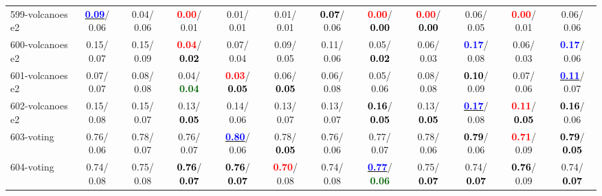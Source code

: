 \begin{table}[h]
\begin{center}
{\begin{tabular}{lc|c|c|c|c|c|c|c|c|c|c}
599-volcanoes e2 & \underline{\textcolor{blue}{\textbf{  0.09}}}/  0.06 &   0.04/  0.06 & \textcolor{red}{\textbf{  0.00}}/  0.01 &   0.01/  0.01 &   0.01/  0.01 & \textcolor{black}{\textbf{  0.07}}/  0.06 & \textcolor{red}{\textbf{  0.00}}/\textcolor{black}{\textbf{  0.00}} & \textcolor{red}{\textbf{  0.00}}/\textcolor{black}{\textbf{  0.00}} &   0.06/  0.05 & \textcolor{red}{\textbf{  0.00}}/  0.01 &   0.06/  0.06 \\
600-volcanoes e2 &   0.15/  0.07 &   0.15/  0.09 & \textcolor{red}{\textbf{  0.04}}/\textcolor{black}{\textbf{  0.02}} &   0.07/  0.04 &   0.09/  0.05 &   0.11/  0.06 &   0.05/\textcolor{black}{\textbf{  0.02}} &   0.06/  0.03 & \textcolor{blue}{\textbf{  0.17}}/  0.08 &   0.06/  0.03 & \textcolor{blue}{\textbf{  0.17}}/  0.06 \\
601-volcanoes e2 &   0.07/  0.07 &   0.08/  0.08 &   0.04/\textcolor{darkgreen}{\textbf{  0.04}} & \textcolor{red}{\textbf{  0.03}}/\textcolor{black}{\textbf{  0.05}} &   0.06/\textcolor{black}{\textbf{  0.05}} &   0.06/  0.08 &   0.05/  0.06 &   0.08/  0.08 & \textcolor{black}{\textbf{  0.10}}/  0.09 &   0.07/  0.06 & \underline{\textcolor{blue}{\textbf{  0.11}}}/  0.07 \\
602-volcanoes e2 &   0.15/  0.08 &   0.15/  0.07 &   0.13/\textcolor{black}{\textbf{  0.05}} &   0.14/  0.06 &   0.13/  0.07 &   0.13/  0.07 & \textcolor{black}{\textbf{  0.16}}/\textcolor{black}{\textbf{  0.05}} &   0.13/\textcolor{black}{\textbf{  0.05}} & \underline{\textcolor{blue}{\textbf{  0.17}}}/  0.08 & \textcolor{red}{\textbf{  0.11}}/\textcolor{black}{\textbf{  0.05}} & \textcolor{black}{\textbf{  0.16}}/  0.06 \\
603-voting &   0.76/  0.06 &   0.78/  0.07 &   0.76/  0.07 & \underline{\textcolor{blue}{\textbf{  0.80}}}/  0.06 &   0.78/\textcolor{black}{\textbf{  0.05}} &   0.76/  0.06 &   0.77/  0.07 &   0.78/  0.06 & \textcolor{black}{\textbf{  0.79}}/  0.06 & \textcolor{red}{\textbf{  0.71}}/  0.09 & \textcolor{black}{\textbf{  0.79}}/\textcolor{black}{\textbf{  0.05}} \\
604-voting &   0.74/  0.08 &   0.75/  0.08 & \textcolor{black}{\textbf{  0.76}}/\textcolor{black}{\textbf{  0.07}} & \textcolor{black}{\textbf{  0.76}}/\textcolor{black}{\textbf{  0.07}} & \textcolor{red}{\textbf{  0.70}}/  0.08 &   0.74/  0.08 & \underline{\textcolor{blue}{\textbf{  0.77}}}/\textcolor{darkgreen}{\textbf{  0.06}} &   0.75/\textcolor{black}{\textbf{  0.07}} &   0.74/\textcolor{black}{\textbf{  0.07}} & \textcolor{black}{\textbf{  0.76}}/  0.09 &   0.74/\textcolor{black}{\textbf{  0.07}} \\ \hline

\end{tabular}}
\end{center}
\end{table}
